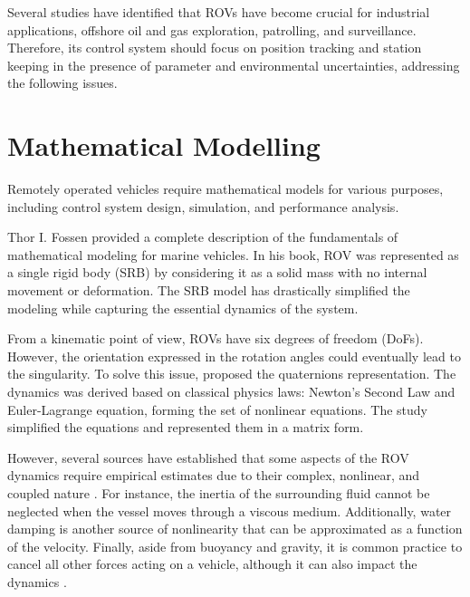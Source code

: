     Several studies \cite{rov_review, overview} have identified that ROVs have become crucial for industrial applications,
    offshore oil and gas exploration, patrolling, and surveillance. Therefore, its control system
    should focus on position tracking and station keeping in the presence of parameter and environmental uncertainties, addressing the following issues.


\section{Mathematical Modelling}

    Remotely operated vehicles require mathematical models for various purposes, including control
    system design, simulation, and performance analysis.

    Thor I. Fossen \cite{fossen:guidance} provided a complete description of the fundamentals of mathematical modeling for marine
    vehicles. In his book, ROV was represented as a single rigid body (SRB) by considering 
    it as a solid mass with no internal movement or deformation. The SRB model has drastically simplified the modeling while capturing the essential
    dynamics of the system. 

    From a kinematic
    point of view, ROVs have six degrees of freedom (DoFs). However, the orientation expressed
    in the rotation angles could eventually lead to the singularity. To solve this issue,
    \cite{quat_smc} proposed the quaternions representation. The dynamics was derived based on classical
    physics laws: Newton’s Second Law and Euler-Lagrange equation, forming the set of nonlinear equations.
    The study \cite{identification} simplified the equations and represented them in a matrix form.

    However, several sources have established that some aspects of the ROV dynamics require empirical
    estimates due to their complex, nonlinear, and coupled nature \cite{fossen:guidance, bluerov}. For instance, the inertia
    of the surrounding fluid cannot be neglected when the vessel moves through a viscous medium. Additionally, water damping is another source of nonlinearity that
    can be approximated as a function of the velocity. Finally, aside from buoyancy and
    gravity, it is common practice to cancel all other forces acting on a vehicle, although it can also impact the dynamics \cite{bluerov}.

